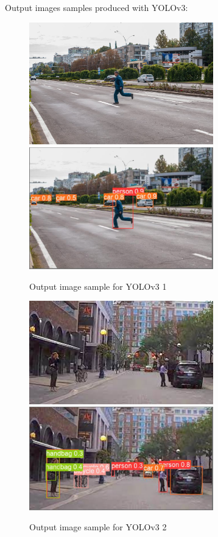 \documentclass[runningheads,a4paper,11pt]{report}
\begin{document}
Output images samples produced with YOLOv3:
\begin{figure}
    \centering
\includegraphics[width=8cm]{images/image1.png}   
\includegraphics[width=8cm]{images/image1_label.PNG}    \caption{Output image sample for YOLOv3 1}\label{fig:outyolo1}
\end{figure}
\begin{figure}
    \centering
\includegraphics[width=8cm]{images/image2.jpg}   
\includegraphics[width=8cm]{images/image2_label.PNG} \caption{Output image sample for YOLOv3 2}\label{fig:outyolo2}
\end{figure}
\end{document}
